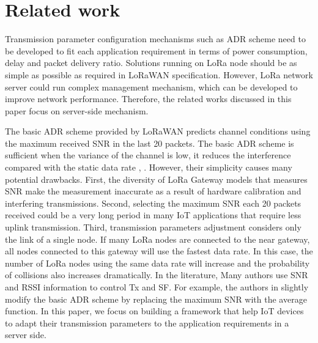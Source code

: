 \section{Related work} \label{sec:Related work}

Transmission parameter configuration mechanisms such as \ac{ADR} scheme need to be developed to fit each application requirement in terms of power consumption,
	delay and packet delivery ratio.
Solutions running on LoRa node should be as simple as possible as required in LoRaWAN specification.
However,
	LoRa network server could run complex management mechanism,
	which can be developed to improve network performance.
Therefore,
	the related works discussed in this paper focus on server-side mechanism.

The basic \ac{ADR} scheme \cite{LorawanSpecification} provided by LoRaWAN predicts channel conditions using the maximum received \ac{SNR} in the last 20 packets.
The basic \ac{ADR} scheme is sufficient when the variance of the channel is low, 
	it reduces the interference compared with the static data rate \cite{bor_lora_2016}, \cite{slabicki_adaptive_2018}.
However,
	their simplicity causes many potential drawbacks.
First,
	the diversity of LoRa Gateway models that measures \ac{SNR} make the measurement inaccurate as a result of hardware calibration and interfering transmissions.
Second,
	selecting the maximum \ac{SNR} each 20 packets received could be a very long period in many IoT applications that require less uplink transmission.
Third,
	transmission parameters adjustment considers only the link of a single node.
If many LoRa nodes are connected to the near gateway,
	all nodes connected to this gateway will use the fastest data rate.
In this case,
	the number of LoRa nodes using the same data rate will increase and the probability of collisions also increases dramatically.
In the literature,
	Many authors use \ac{SNR} and \ac{RSSI} information to control \ac{Tx} and \ac{SF}.
For example,
	the authors in \cite{slabicki_adaptive_2018} slightly modify the basic \ac{ADR} scheme by replacing the maximum \ac{SNR} with the average function.
In this paper,
	we focus on building a framework that help IoT devices to adapt their transmission parameters to the application requirements in a server side.

